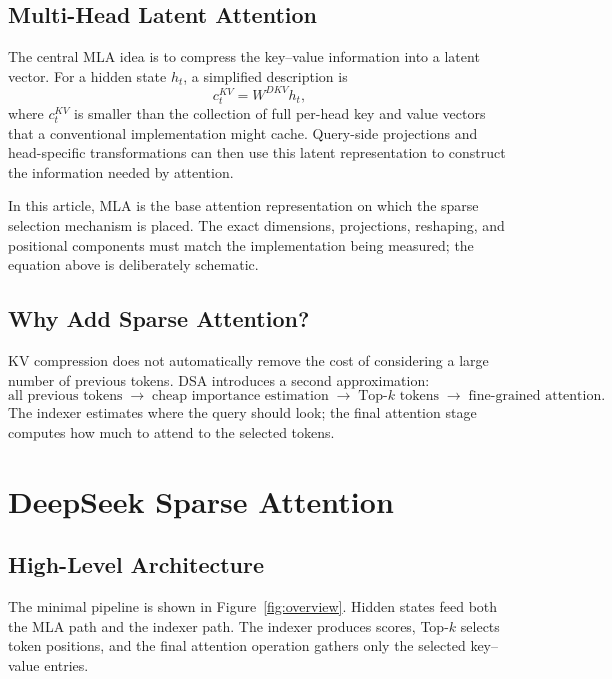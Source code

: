 \documentclass[11pt]{article}
\begin{document}
\subsection{Multi-Head Latent Attention}

The central MLA idea is to compress the key--value information into a latent
vector. For a hidden state $h_t$, a simplified description is
\begin{equation}
    c_t^{KV} = W^{DKV}h_t,
\end{equation}
where $c_t^{KV}$ is smaller than the collection of full per-head key and value
vectors that a conventional implementation might cache. Query-side
projections and head-specific transformations can then use this latent
representation to construct the information needed by attention.

In this article, MLA is the base attention representation on which the sparse
selection mechanism is placed. The exact dimensions, projections, reshaping,
and positional components must match the implementation being measured; the
equation above is deliberately schematic.

\subsection{Why Add Sparse Attention?}

KV compression does not automatically remove the cost of considering a large
number of previous tokens. DSA introduces a second approximation:
\begin{equation}
\text{all previous tokens}
\;\longrightarrow\;
\text{cheap importance estimation}
\;\longrightarrow\;
\text{Top-}k\text{ tokens}
\;\longrightarrow\;
\text{fine-grained attention}.
\end{equation}
The indexer estimates where the query should look; the final attention stage
computes how much to attend to the selected tokens.

\section{DeepSeek Sparse Attention}

\subsection{High-Level Architecture}

The minimal pipeline is shown in Figure~\ref{fig:overview}. Hidden states feed
both the MLA path and the indexer path. The indexer produces scores, Top-$k$
selects token positions, and the final attention operation gathers only the
selected key--value entries.
\end{document}
